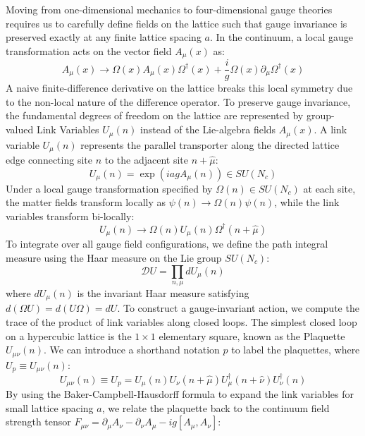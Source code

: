 Moving from one-dimensional mechanics to four-dimensional gauge theories requires us to carefully define fields on the lattice such that gauge invariance is preserved exactly at any finite lattice spacing $a$. In the continuum, a local gauge transformation acts on the vector field $A_\mu(x)$ as:
\begin{equation}
A_\mu(x) \to \Omega(x) A_\mu(x) \Omega^\dagger(x) + \frac{i}{g} \Omega(x) \partial_\mu \Omega^\dagger(x)
\label{eq:cont_gauge_trans}
\end{equation}
A naive finite-difference derivative on the lattice breaks this local symmetry due to the non-local nature of the difference operator. To preserve gauge invariance, the fundamental degrees of freedom on the lattice are represented by group-valued Link Variables $U_\mu(n)$ instead of the Lie-algebra fields $A_\mu(x)$. A link variable $U_\mu(n)$ represents the parallel transporter along the directed lattice edge connecting site $n$ to the adjacent site $n+\hat{\mu}$:
\begin{equation}
U_\mu(n) = \exp\left(i a g A_\mu(n)\right) \in SU(N_c)
\label{eq:link_variable}
\end{equation}
Under a local gauge transformation specified by $\Omega(n) \in SU(N_c)$ at each site, the matter fields transform locally as $\psi(n) \to \Omega(n)\psi(n)$, while the link variables transform bi-locally:
\begin{equation}
U_\mu(n) \to \Omega(n) U_\mu(n) \Omega^\dagger(n+\hat{\mu})
\label{eq:link_gauge_trans}
\end{equation}
To integrate over all gauge field configurations, we define the path integral measure using the Haar measure on the Lie group $SU(N_c)$:
\begin{equation}
\mathcal{D}U = \prod_{n, \mu} dU_\mu(n)
\label{eq:haar_measure}
\end{equation}
where $dU_\mu(n)$ is the invariant Haar measure satisfying $d(\Omega U) = d(U \Omega) = dU$. To construct a gauge-invariant action, we compute the trace of the product of link variables along closed loops. The simplest closed loop on a hypercubic lattice is the $1 \times 1$ elementary square, known as the Plaquette $U_{\mu\nu}(n)$. We can introduce a shorthand notation $p$ to label the plaquettes, where $U_p \equiv U_{\mu\nu}(n)$:
\begin{equation}
U_{\mu\nu}(n) \equiv U_p = U_\mu(n) U_\nu(n+\hat{\mu}) U_\mu^\dagger(n+\hat{\nu}) U_\nu^\dagger(n)
\label{eq:plaquette}
\end{equation}
By using the Baker-Campbell-Hausdorff formula to expand the link variables for small lattice spacing $a$, we relate the plaquette back to the continuum field strength tensor $F_{\mu\nu} = \partial_\mu A_\nu - \partial_\nu A_\mu - i g [A_\mu, A_\nu]$:
